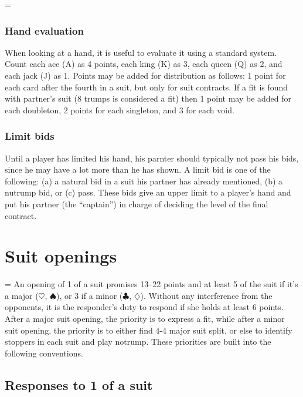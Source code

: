 \documentclass[oneside]{memoir}
\makeatletter
\newif\if@extratext
\newenvironment{extra}{\if@extratext\else\setbox\@throwaway=\vbox\bgroup\fi}%
	       {\if@extratext\else\egroup\fi}
\def\C{$\clubsuit$}
\def\D{$\diamondsuit$}
\def\H{$\heartsuit$}
\def\S{$\spadesuit$}
\makeatother
\begin{document}
\begin{extra}
  \subsection*{Hand evaluation}
  When looking at a hand, it is useful to evaluate it using a standard system.
  Count each ace (A) as 4 points, each king (K) as 3, each queen (Q) as 2,
  and each jack (J) as 1.  Points may be added for distribution as follows:
  1 point for each card after the fourth in a suit, but only for suit 
  contracts.  If a fit is found with partner's suit (8 trumps is considered
  a fit) then 1 point may be added for each doubleton, 2 points for each 
  singleton, and 3 for each void.  
  \subsection*{Limit bids}
  Until a player has limited his hand, his parnter should typically
  not pass his bids, since he may have a lot more than he has shown.
  A limit bid is one of the following: (a) a natural bid in a suit his 
  partner has already mentioned, (b) a nutrump bid, or (c) pass.  These
  bids give an upper limit to a player's hand and put his partner 
  (the ``captain'') in charge of deciding the level of the final contract.
\end{extra}

\chapter{Suit openings}

\begin{extra}
  An opening of 1 of a suit promises 13--22 points and at least 5 of the suit
  if it's a major (\H, \S), or 3 if a minor (\C, \D).  Without any
  interference from the opponents, it is the responder's duty to respond if
  she holds at least 6 points.  After a major suit opening, the priority
  is to express a fit, while after a minor suit opening, the priority is
  to either find 4-4 major suit split, or else to identify stoppers in
  each suit and play notrump.  These priorities are built into the following
  conventions.
\end{extra}

\section{Responses to 1 of a suit}
\end{document}
